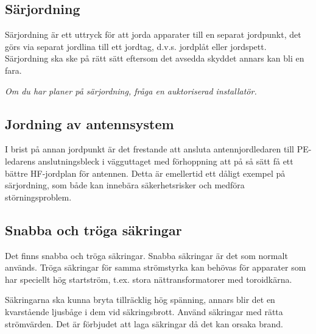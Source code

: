 \subsection{Särjordning}

Särjordning är ett uttryck för att jorda apparater till en separat jordpunkt,
det görs via separat jordlina till ett jordtag, d.v.s. jordplåt eller jordspett.
Särjordning ska ske på rätt sätt eftersom det avsedda skyddet annars kan bli en
fara.

\emph{Om du har planer på särjordning, fråga en auktoriserad installatör.}

\subsection{Jordning av antennsystem}

I brist på annan jordpunkt är det frestande att ansluta antennjordledaren till
PE-ledarens anslutningsbleck i vägguttaget med förhoppning att på så sätt få
ett bättre HF-jordplan för antennen.
Detta är emellertid ett dåligt exempel på särjordning, som både kan innebära
säkerhetsrisker och medföra störningsproblem.

\subsection{Snabba och tröga säkringar}

Det finns snabba och tröga säkringar.
Snabba säkringar är det som normalt används.
Tröga säkringar för samma strömstyrka kan behövas för apparater som har
speciellt hög startström, t.ex. stora nättransformatorer med toroidkärna.

Säkringarna ska kunna bryta tillräcklig hög spänning, annars blir det
en kvarstående ljusbåge i dem vid säkringsbrott.
Använd säkringar med rätta strömvärden.
Det är förbjudet att laga säkringar då det kan orsaka brand.
